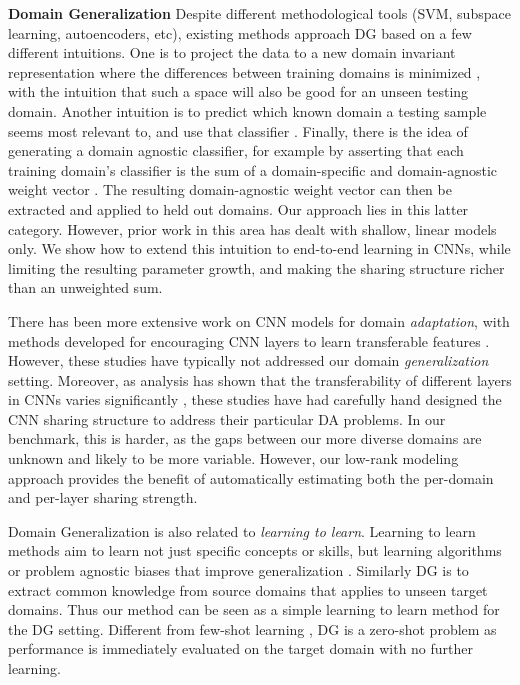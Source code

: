 \documentclass[10pt,twocolumn,letterpaper]{article}
\begin{document}
\vspace{0.1cm}\noindent\textbf{Domain Generalization}\quad
Despite different methodological tools (SVM, subspace learning, autoencoders, etc), existing methods approach DG based on a few different intuitions. One is to project the data to a new domain invariant representation where the differences between training domains is minimized \cite{muandet2013domainGen,ghifary2015domain}, with the intuition that such a space will also be good for an unseen testing domain. Another intuition is to predict which known domain a testing sample seems most relevant to, and use that classifier \cite{xu2014exploiting}. Finally, there is the idea of generating a domain agnostic classifier, for example by asserting that each training domain's classifier is the sum of a domain-specific and domain-agnostic weight vector \cite{ECCV12_Khosla}. The resulting domain-agnostic weight vector can then be extracted and applied to held out domains. Our approach lies in this latter category. However, prior work in this area has dealt with shallow, linear models only. We show how to extend this intuition to end-to-end learning in CNNs, while limiting the resulting parameter growth, and making the sharing structure richer than an unweighted sum.

There has been more extensive work on CNN models for domain \emph{adaptation}, with methods developed for encouraging CNN layers to learn transferable features \cite{ganin2015udaBackprop,long2015deepAdaptationNetworks}. However, these studies have typically not addressed our domain \emph{generalization} setting. Moreover, as analysis has shown that the transferability of different layers in CNNs varies significantly \cite{yosinski2014howTransferable}, these studies have had carefully hand designed the CNN sharing structure to address their particular DA problems. In our benchmark, this is harder, as the gaps between our more diverse domains are unknown and likely to be more variable. However, our low-rank modeling approach provides the benefit of automatically estimating both the per-domain and per-layer sharing strength.

Domain Generalization is also related to \emph{learning to learn}. Learning to learn methods aim to learn not just specific concepts or skills, but learning algorithms or problem agnostic biases that improve generalization \cite{metanetworks2017,ravi2016optimization,finn2017model}.
Similarly  DG is to extract common knowledge from source domains that applies to unseen target domains.
Thus our method can be seen as a simple learning to learn method for the DG setting. Different from few-shot learning \cite{finn2017model,ravi2016optimization}, DG is a zero-shot problem as performance is immediately evaluated on the target domain with no further learning. 
\end{document}
